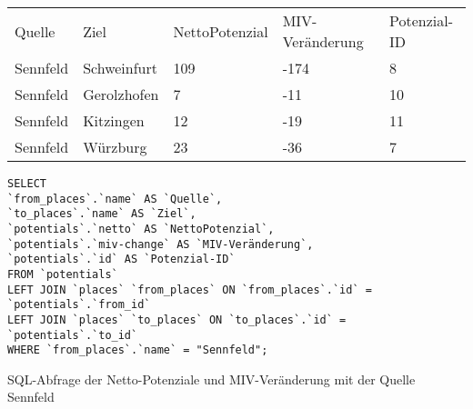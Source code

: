 \begin{tabular}{ l  l  l  l  l }
    Quelle & Ziel & NettoPotenzial & MIV-Veränderung & Potenzial-ID\\ 
    Sennfeld & Schweinfurt & 109 & -174 & 8\\ 
    Sennfeld & Gerolzhofen & 7 & -11 & 10\\ 
    Sennfeld & Kitzingen & 12 & -19 & 11\\ 
    Sennfeld & Würzburg & 23 & -36 & 7\\ 
    \end{tabular}    
\newline
\newline
\begin{listing}[htbp]
\begin{verbatim}
SELECT
`from_places`.`name` AS `Quelle`, 
`to_places`.`name` AS `Ziel`, 
`potentials`.`netto` AS `NettoPotenzial`, 
`potentials`.`miv-change` AS `MIV-Veränderung`, 
`potentials`.`id` AS `Potenzial-ID`
FROM `potentials`
LEFT JOIN `places` `from_places` ON `from_places`.`id` = `potentials`.`from_id`
LEFT JOIN `places` `to_places` ON `to_places`.`id` = `potentials`.`to_id`
WHERE `from_places`.`name` = "Sennfeld";
\end{verbatim}
\caption{SQL-Abfrage der Netto-Potenziale und MIV-Veränderung mit der Quelle Sennfeld}\label{lst-fz-sennfeld}
\end{listing}